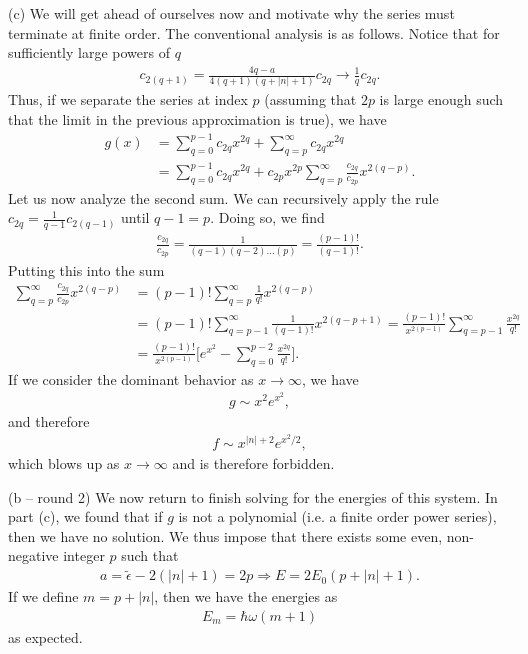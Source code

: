 {(c) We will get ahead of ourselves now and motivate why the series must terminate at finite order.
The conventional analysis is as follows.
Notice that for sufficiently large powers of $q$
\begin{eqnarray}
    c_{2(q+1)} = \frac{4q - a}{4(q+1)(q + |n| + 1)} c_{2q} \rightarrow \frac{1}{q} c_{2q} 
.\end{eqnarray}
Thus, if we separate the series at index $p$ (assuming that $2p$ is large enough such that the limit in the previous approximation is true), we have
\begin{align}
    g(x) &= \sum_{q=0}^{p-1} c_{2q} x^{2q} + \sum_{q=p}^{\infty} c_{2q} x^{2q} \nonumber \\
         &= \sum_{q=0}^{p-1} c_{2q} x^{2q} + c_{2p} x^{2p} \sum_{q=p}^{\infty} \frac{c_{2q}}{c_{2p}} x^{2(q-p)}
.\end{align}
Let us now analyze the second sum.
We can recursively apply the rule $c_{2q} = \frac{1}{q-1} c_{2(q-1)}$ until $q-1 = p$.
Doing so, we find
\begin{eqnarray}
    \frac{c_{2q}}{c_{2p}} = \frac{1}{(q-1)(q-2)\ldots(p)} = \frac{(p-1)!}{(q-1)!}
.\end{eqnarray}
Putting this into the sum
\begin{align}
    \sum_{q=p}^{\infty} \frac{c_{2q}}{c_{2p}} x^{2(q-p)} &= (p-1)! \sum_{q=p}^{\infty} \frac{1}{q!} x^{2(q-p)} \nonumber \\
                                                         &= (p-1)! \sum_{q=p-1}^{\infty} \frac{1}{(q-1)!} x^{2(q-p+1)} = \frac{(p-1)!}{x^{2(p-1)}} \sum_{q=p-1}^{\infty} \frac{x^{2q}}{q!} \nonumber \\
                                                         &= \frac{(p-1)!}{x^{2(p-1)}} \Bigg[ e^{x^2} - \sum_{q=0}^{p-2} \frac{x^{2q}}{q!} \Bigg]
.\end{align}
If we consider the dominant behavior as $x \rightarrow \infty$, we have
\begin{eqnarray}
    g \sim x^2 e^{x^2}
,\end{eqnarray}
and therefore
\begin{eqnarray}
    f \sim x^{|n|+2} e^{x^2/2}
,\end{eqnarray}
which blows up as $x \rightarrow \infty$ and is therefore forbidden.

(b -- round 2) We now return to finish solving for the energies of this system.
In part (c), we found that if $g$ is not a polynomial (i.e. a finite order power series), then we have no solution.
We thus impose that there exists some even, non-negative integer $p$ such that
\begin{eqnarray}
    a = \tilde{\epsilon} - 2(|n|+1) = 2p \Rightarrow E = 2E_0(p + |n| + 1)
.\end{eqnarray}
If we define $m = p + |n|$, then we have the energies as
\begin{eqnarray}
    E_{m} = \hbar \omega (m + 1)
\end{eqnarray}
as expected.

}
